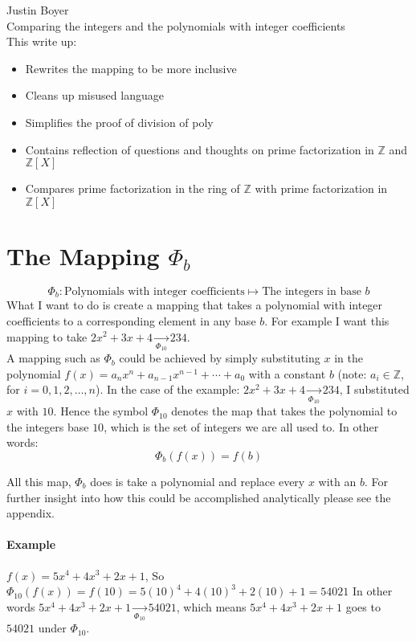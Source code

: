 \documentclass[12pt]{article}
\begin{document}



Justin Boyer\\
Comparing the integers and the polynomials with integer coefficients\\


This write up:
\begin{itemize}
\item Rewrites the mapping to be more inclusive
\item Cleans up misused language
\item Simplifies the proof of division of poly
\item Contains reflection of questions and thoughts on prime factorization in $\mathbb{Z}$ and $\mathbb{Z}[X]$
\item Compares prime factorization in the ring of $\mathbb{Z}$ with prime factorization in $\mathbb{Z}[X]$
\end{itemize}

\section*{The Mapping $\Phi_b$}
$$
\Phi_b: \text{Polynomials with integer coefficients} \mapsto \text{The integers in base }b
$$
What I want to do is create a mapping that takes a polynomial with integer coefficients to a corresponding element in any base $b$.  For example I want this mapping to take $2x^2+3x+4 \xrightarrow[\Phi_{10}]{} 234$.\\  A mapping such as $\Phi_b$ could be achieved by simply  substituting $x$ in the polynomial $f(x) = a_n x^n +a_{n-1} x^{n-1} + \cdots + a_0$ with a constant $b$ (note: $a_i \in \mathbb{Z}$, for $i=0, 1, 2, \ldots, n$).  In the case of the example: $2x^2+3x+4 \xrightarrow[\Phi_{10}]{} 234$, I substituted $x$ with $10$.  Hence the symbol $\Phi_{10}$ denotes the map that takes the polynomial to the integers base $10$, which is the set of integers we are all used to.  In other words:
$$ \Phi_b(f(x)) = f(b)$$

All this map, $\Phi_b$ does is take a polynomial and replace every $x$ with an $b$.  For further insight into how this could be accomplished analytically please see the appendix.

\paragraph*{Example}
$f(x)= 5x^4+4x^3+2x+1$, So $\Phi_{10}(f(x))= f(10) = 5(10)^4 + 4(10)^3 + 2(10) + 1 = 54021$  In other words $5x^4+4x^3+2x+1 \xrightarrow[\Phi_{10}]{} 54021$, which means $5x^4+4x^3+2x+1$ goes to $54021$ under $\Phi_{10}$.
\end{document}
